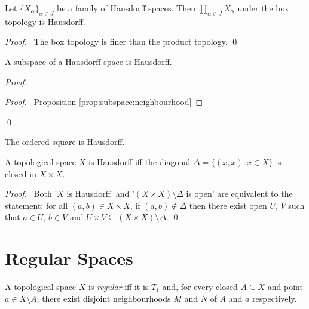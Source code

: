 \begin{cor}
  Let $\{ X_\alpha \}_{\alpha \in J}$ be a family of Hausdorff spaces. Then $\prod_{\alpha \in J} X_\alpha$ under the box topology is Hausdorff.
\end{cor}

\begin{proof}
  \pf\ The box topology is finer than the product topology. \qed
\end{proof}

\begin{prop}
  A subspace of a Hausdorff space is Hausdorff.
\end{prop}

\begin{proof}
  \pf
  \begin{proof}
    \pf\ Proposition \ref{prop:subspace:neighbourhood}
  \end{proof}
  \qed
\end{proof}

\begin{cor}
  The ordered square is Hausdorff.
\end{cor}

\begin{prop}
  A topological space $X$ is Hausdorff iff the diagonal $\Delta = \{ (x,x) : x \in X \}$ is closed in $X \times X$.
\end{prop}

\begin{proof}
  \pf\ Both '$X$ is Hausdorff' and '$(X \times X) \setminus \Delta$ is open' are equivalent to the statement: for all $(a,b) \in X \times X$, if $(a,b) \notin \Delta$ then there exist open $U$, $V$ such that $a \in U$, $b \in V$ and $U \times V \subseteq (X \times X) \setminus \Delta$. \qed
\end{proof}

\section{Regular Spaces}

\begin{df}[Regular]
  A topological space $X$ is \emph{regular} iff it is $T_1$ and, for every closed $A \subseteq X$ and point $a \in X \setminus A$, there exist disjoint neighbourhoods $M$ and $N$ of $A$ and $a$ respectively.
\end{df}
